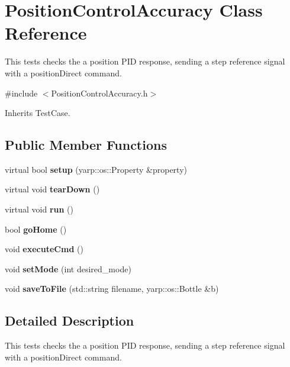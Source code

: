 \section{Position\+Control\+Accuracy Class Reference}
\label{classPositionControlAccuracy}


This tests checks the a position P\+ID response, sending a step reference signal with a position\+Direct command.  




{\ttfamily \#include $<$Position\+Control\+Accuracy.\+h$>$}



Inherits Test\+Case.

\subsection*{Public Member Functions}
\begin{DoxyCompactItemize}
\item 
\mbox{\label{classPositionControlAccuracy_adb156243b1570d3276e7e6f217191ac6}} 
virtual bool {\bfseries setup} (yarp\+::os\+::\+Property \&property)
\item 
\mbox{\label{classPositionControlAccuracy_a8b495b1aad8dc533b511d3174ee18c39}} 
virtual void {\bfseries tear\+Down} ()
\item 
\mbox{\label{classPositionControlAccuracy_ac8736e319fec35ddbc438cca26af1edc}} 
virtual void {\bfseries run} ()
\item 
\mbox{\label{classPositionControlAccuracy_abbd39a006a4eaf23d6f1f87c075b1eb5}} 
bool {\bfseries go\+Home} ()
\item 
\mbox{\label{classPositionControlAccuracy_a2bf6444424941e46c05ea0ce688541dd}} 
void {\bfseries execute\+Cmd} ()
\item 
\mbox{\label{classPositionControlAccuracy_a7283e81727c2bf30637d3e6624b286dd}} 
void {\bfseries set\+Mode} (int desired\+\_\+mode)
\item 
\mbox{\label{classPositionControlAccuracy_ab91897f04d1850ba76a30c4c75f7f186}} 
void {\bfseries save\+To\+File} (std\+::string filename, yarp\+::os\+::\+Bottle \&b)
\end{DoxyCompactItemize}


\subsection{Detailed Description}
This tests checks the a position P\+ID response, sending a step reference signal with a position\+Direct command. 

